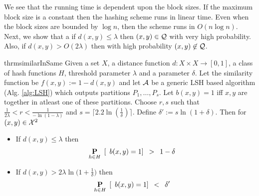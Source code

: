 \noindent We see that the running time is dependent upon the block sizes. If the maximum block size is a constant then the hashing scheme runs in linear time. Even when the block sizes are bounded by $\log n$, then the scheme runs in $O(n \log n)$.  Next, we show that a if $d(x, y) \le \lambda$ then $(x, y) \in \mathcal Q$ with very high probability. Also, if $d(x, y) > O(2\lambda)$ then with high probability $(x, y) \not\in \mathcal Q$.   

\begin{restatable}{thrm}{similarInSame}
\label{thm:similarInSame}
Given a set $X$, a distance function $d: X \times X \rightarrow [0, 1]$, a class of hash functions $H$, threshold parameter $\lambda$ and a parameter $\delta$. Let the similarity function be $f(x, y) := 1 - d(x, y)$ and let $\mathcal A$ be a generic LSH based algorithm (Alg. \ref{alg:LSH}) which outputs partitions $P_1, \ldots, P_s$. Let $b(x, y) = 1$ iff $x, y$ are together in atleast one of these partitions. 
\noindent Choose $r, s$ such that $\frac{1}{2\lambda} < r < \frac{1}{-\ln(1-\lambda)} $ and $s =  \lceil 2.2\ln(\frac{1}{\delta})\rceil$. Define $\delta' := s\ln(1+\delta)$. Then for $(x, y) \in \mathcal X^2$
\begin{itemize}
	\item If $d(x, y) \le \lambda$ then 
	\begin{align*}
		& \underset{h \in H}{\mathbf P} \enspace[\enspace b(x, y) = 1 ] \enspace > \enspace 1 - \delta
	\end{align*}
	\item If $d(x, y) > 2\lambda\ln\big(1+\frac{1}{\delta}\big)$ then 
	\begin{align*}
		& \underset{h \in H}{\mathbf P} \enspace[\enspace b(x, y) = 1 ] \enspace < \enspace \delta'
	\end{align*}
\end{itemize}
\end{restatable}
